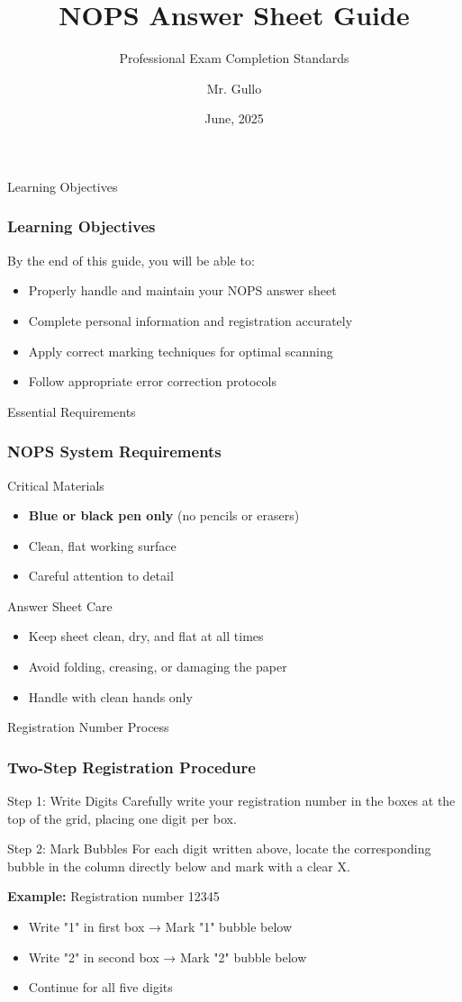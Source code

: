 \documentclass{beamer}
\title[NOPS Guide]{NOPS Answer Sheet Guide}
\subtitle{Professional Exam Completion Standards}
\author[Mr. Gullo]{Mr. Gullo}
\date[June 2025]{June, 2025}
\begin{document}
\frame{\titlepage}

\begin{frame}{Learning Objectives}
\frametitle{Learning Objectives}
By the end of this guide, you will be able to:
\begin{itemize}
\item Properly handle and maintain your NOPS answer sheet
\item Complete personal information and registration accurately
\item Apply correct marking techniques for optimal scanning
\item Follow appropriate error correction protocols
\end{itemize}
\end{frame}

\begin{frame}{Essential Requirements}
\frametitle{NOPS System Requirements}
\begin{block}{Critical Materials}
\begin{itemize}
\item \textbf{Blue or black pen only} (no pencils or erasers)
\item Clean, flat working surface
\item Careful attention to detail
\end{itemize}
\end{block}

\begin{block}{Answer Sheet Care}
\begin{itemize}
\item Keep sheet clean, dry, and flat at all times
\item Avoid folding, creasing, or damaging the paper
\item Handle with clean hands only
\end{itemize}
\end{block}
\end{frame}

\begin{frame}{Registration Number Process}
\frametitle{Two-Step Registration Procedure}
\begin{block}{Step 1: Write Digits}
Carefully write your registration number in the boxes at the top of the grid, placing one digit per box.
\end{block}

\begin{block}{Step 2: Mark Bubbles}
For each digit written above, locate the corresponding bubble in the column directly below and mark with a clear X.
\end{block}

\textbf{Example:} Registration number 12345
\begin{itemize}
\item Write "1" in first box → Mark "1" bubble below
\item Write "2" in second box → Mark "2" bubble below
\item Continue for all five digits
\end{itemize}
\end{frame}
\end{document}
